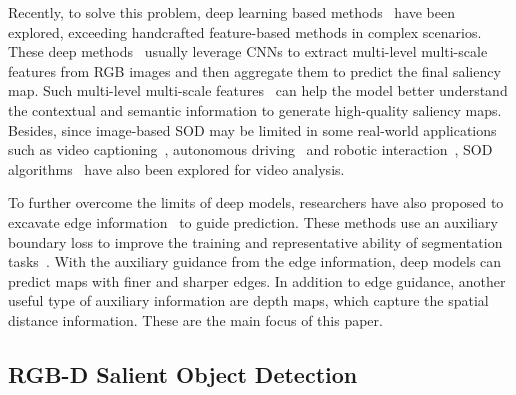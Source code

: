 \documentclass[journal]{IEEEtran}
\begin{document}
Recently, to solve this problem, deep learning based methods~\cite{Chen_2018_reverse,Zhang2018PAGR,Su_2019_ICCV,zhang2020multi,Li_2019_video} have been explored, exceeding handcrafted feature-based methods in complex scenarios.
These deep methods~\cite{ZhangWLWR17} usually leverage CNNs to extract multi-level multi-scale features from RGB images and then aggregate them to predict the final saliency map.
Such multi-level multi-scale features~\cite{wang2019progressive,wei2019f3net} can help the model better understand the contextual and semantic information to generate high-quality saliency maps.
Besides, since image-based SOD may be limited in some real-world applications such as video captioning~\cite{PanYLM17caption}, autonomous driving~\cite{ZhangFU16drive} and robotic interaction~\cite{XuPCYH16interactive}, SOD algorithms~\cite{Fan2019VSOD,Yan_2019_video} have also been explored for video analysis. 


To further overcome the limits of deep models, researchers have also proposed to excavate edge information~\cite{XieT17edge} to guide prediction.
These methods use an auxiliary boundary loss to improve the training and representative ability of segmentation tasks~\cite{ZhugeYZL18edge,zhao2019egnet,wu2019stacked}.
With the auxiliary guidance from the edge information, deep models can predict maps with finer and sharper edges.
In addition to edge guidance, another useful type of auxiliary information are depth maps, which capture the spatial distance information. These are the main focus of this paper. 

\subsection{RGB-D Salient Object Detection}\label{sec:rgbd}
\end{document}
